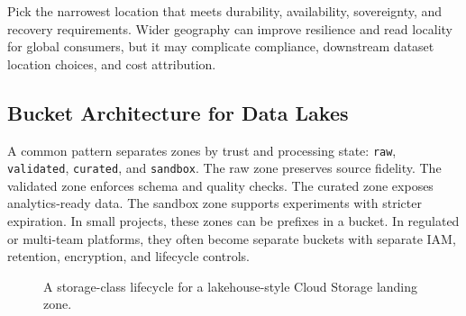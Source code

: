 \begin{tipbox}
Pick the narrowest location that meets durability, availability, sovereignty, and recovery requirements. Wider geography can improve resilience and read locality for global consumers, but it may complicate compliance, downstream dataset location choices, and cost attribution.
\end{tipbox}

\subsection{Bucket Architecture for Data Lakes}
A common pattern separates zones by trust and processing state: \texttt{raw}, \texttt{validated}, \texttt{curated}, and \texttt{sandbox}. The raw zone preserves source fidelity. The validated zone enforces schema and quality checks. The curated zone exposes analytics-ready data. The sandbox zone supports experiments with stricter expiration. In small projects, these zones can be prefixes in a bucket. In regulated or multi-team platforms, they often become separate buckets with separate IAM, retention, encryption, and lifecycle controls.

\begin{figure}[H]
    \centering
    \caption{A storage-class lifecycle for a lakehouse-style Cloud Storage landing zone.}
    \label{fig:storage-class-lifecycle}
\end{figure}

